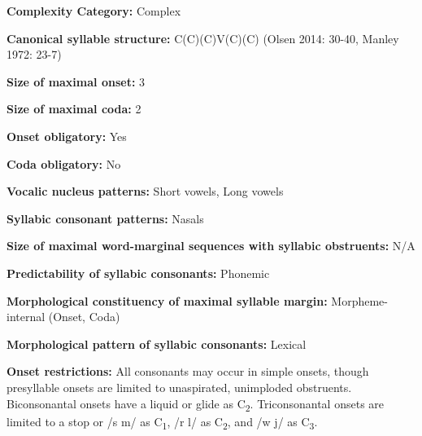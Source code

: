 \begin{styleBody}
\textbf{Complexity Category:} Complex
\end{styleBody}

\begin{styleBody}
\textbf{Canonical syllable structure:} C(C)(C)V(C)(C)\textbf{ }(Olsen 2014: 30-40, Manley 1972: 23-7)
\end{styleBody}

\begin{styleBody}
\textbf{Size of maximal onset:} 3
\end{styleBody}

\begin{styleBody}
\textbf{Size of maximal coda:} 2
\end{styleBody}

\begin{styleBody}
\textbf{Onset obligatory:} Yes
\end{styleBody}

\begin{styleBody}
\textbf{Coda obligatory:} No
\end{styleBody}

\begin{styleBody}
\textbf{Vocalic nucleus patterns:} Short vowels, Long vowels
\end{styleBody}

\begin{styleBody}
\textbf{Syllabic consonant patterns:} Nasals
\end{styleBody}

\begin{styleBody}
\textbf{Size of maximal word{}-marginal sequences with syllabic obstruents:} N/A
\end{styleBody}

\begin{styleBody}
\textbf{Predictability of syllabic consonants:} Phonemic
\end{styleBody}

\begin{styleBody}
\textbf{Morphological constituency of maximal syllable margin:} Morpheme-internal (Onset, Coda)
\end{styleBody}

\begin{styleBody}
\textbf{Morphological pattern of syllabic consonants:} Lexical
\end{styleBody}

\begin{styleBody}
\textbf{Onset restrictions: }All consonants may occur in simple onsets, though presyllable onsets are limited to unaspirated, unimploded obstruents. Biconsonantal onsets have a liquid or glide as C\textsubscript{2}. Triconsonantal onsets are limited to a stop or /s m/ as C\textsubscript{1}, /r l/ as C\textsubscript{2}, and /w j/ as C\textsubscript{3}.
\end{styleBody}

